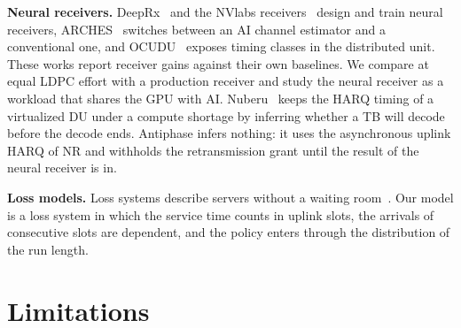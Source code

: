 \documentclass[acmsmall,screen,review,anonymous]{acmart}
\newcommand{\sys}{Antiphase\xspace}
\begin{document}
\noindent\textbf{Neural receivers.} DeepRx~\cite{deeprx} and the NVlabs receivers~\cite{nrx5g,nrxrt} design
and train neural receivers, ARCHES~\cite{arches} switches between an AI channel estimator and a conventional
one, and OCUDU~\cite{ocudu} exposes timing classes in the distributed unit. These works report receiver
gains against their own baselines. We compare at equal LDPC effort with a production receiver and study the
neural receiver as a workload that shares the GPU with AI. Nuberu~\cite{nuberu} keeps the HARQ timing of a
virtualized DU under a compute shortage by inferring whether a TB will decode before the decode ends. \sys
infers nothing: it uses the asynchronous uplink HARQ of NR and withholds the retransmission grant until the
result of the neural receiver is in.

\noindent\textbf{Loss models.} Loss systems describe servers without a waiting room~\cite{harcholbalter}.
Our model is a loss system in which the service time counts in uplink slots, the arrivals of consecutive
slots are dependent, and the policy enters through the distribution of the run length.

\section{Limitations}
\end{document}
